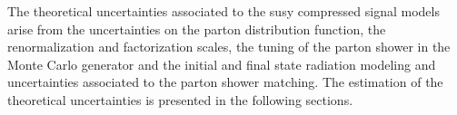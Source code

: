 The theoretical uncertainties associated to the \gls{susy} compressed signal
models arise from the uncertainties on the parton distribution function, the
renormalization and factorization scales, the tuning of the parton shower in the
Monte Carlo generator and the initial and final state radiation modeling and
uncertainties associated to the parton shower matching. The estimation of the
theoretical uncertainties is presented in the following sections.
